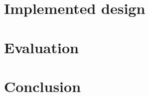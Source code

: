 \documentclass[
a4paper,
12pt,
notitlepage,
parskip=half,
DIV=11,
]{scrbook}
\begin{document}
	\chapter{Implemented design}
	\chapter{Evaluation}
	\chapter{Conclusion}
\end{document}
